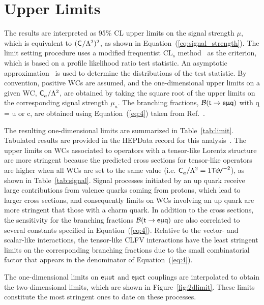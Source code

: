 \section{Upper Limits}
\label{sec:Limits}

The results are interpreted as 95\% \ac{CL} upper limits on the signal strength $\mu$, which is equivalent to $(\textsf{C}^{}_{}/\mathrm{\Lambda}^2)^2$, as shown in Equation~(\ref{eq:signal_strength}). The limit setting procedure uses a modified frequentist CL$_{s}$ method~\cite{Junk:1999kv,Read2002} as the criterion, which is based on a profile likelihood ratio test statistic. An asymptotic approximation~\cite{Cowan:2010js} is used to determine the distributions of the test statistic. By convention, positive \acp{WC} are assumed, and the one-dimensional upper limits on a given \ac{WC}, $\textsf{C}^{}_{a}/\mathrm{\Lambda}^2$, are obtained by taking the square root of the upper limits on the corresponding signal strength $\mu_a$. The branching fractions, $\mathcal{B}(\textsf{t}\rightarrow\textsf{e}\upmu\textsf{q})$ with q = u or c, are obtained using Equation~(\ref{eq:4}) taken from Ref.~\cite{Kile:2008rp}.

The resulting one-dimensional limits are summarized in Table~\ref{tab:limit}. Tabulated results are provided in the HEPData record for this analysis~\cite{hepdata}. The upper limits on \acp{WC} associated to operators with a tensor-like Lorentz structure are more stringent because the predicted cross sections for tensor-like operators are higher when all \acp{WC} are set to the same value (i.e. $\textsf{C}^{}_{a}/\mathrm{\Lambda}^2=1\textsf{TeV}^{-2}$), as shown in Table~\ref{tab:signal}. Signal processes initiated by an up quark receive large contributions from valence quarks coming from protons, which lead to larger cross sections, and consequently limits on \acp{WC} involving an up quark are more stringent that those with a charm quark. In addition to the cross sections, the sensitivity for the branching fractions $\mathcal{B}(\textsf{t}\rightarrow\textsf{e}\upmu\textsf{q})$ are also correlated to several constants specified in Equation~(\ref{eq:4}). Relative to the vector- and scalar-like interactions, the tensor-like \ac{CLFV} interactions have the least stringent limits on the corresponding branching fractions due to the small combinatorial factor that appears in the denominator of Equation~(\ref{eq:4}). 

The one-dimensional limits on $\textsf{e}\upmu\textsf{{u}t}$ and $\textsf{e}\upmu\textsf{{c}t}$ couplings are interpolated to obtain the two-dimensional limits, which are shown in Figure~\ref{fig:2dlimit}. These limits constitute the most stringent ones to date on these processes.

